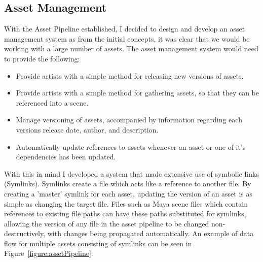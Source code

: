 \documentclass[11pt]{article}
\begin{document}
\subsection{Asset Management} \label{assman}

With the Asset Pipeline established, I decided to design and develop an asset management system as from the initial concepts, it was clear that we would be working with a large number of assets. The asset management system would need to provide the following:

\begin{itemize}

\item Provide artists with a simple method for releasing new versions of assets.

\item Provide artists with a simple method for gathering assets, so that they can be referenced into a scene.

\item Manage versioning of assets, accompanied by information regarding each versions release date, author, and  description.

\item Automatically update references to assets whenever an asset or one of it's dependencies has been updated.

\end{itemize}

With this in mind I developed a system that made extensive use of symbolic links (Symlinks). Symlinks create a file which acts like a reference to another file. By creating a 'master' symlink for each asset, updating the version of an asset is as simple as changing the target file. Files such as Maya scene files which contain references to existing file paths can have these paths substituted for symlinks, allowing the version of any file in the asset pipeline to be changed non-destructively, with changes being propagated automatically. An example of data flow for multiple assets consisting of symlinks can be seen in Figure~\ref{figure:assetPipeline}.
\end{document}
